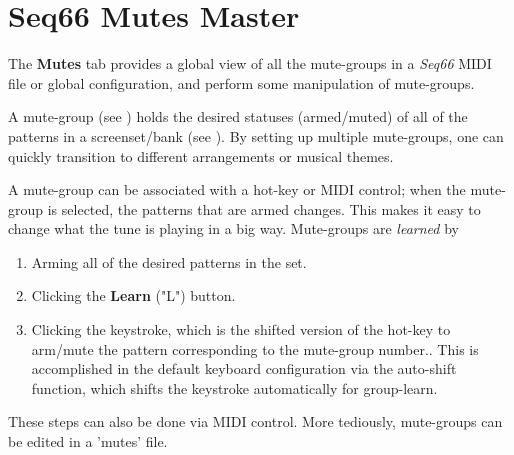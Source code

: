 %
%
%

\section{Seq66 Mutes Master}
\label{sec:mutes_master}

   The \textbf{Mutes} tab provides a global view of all the mute-groups
   in a \textsl{Seq66} MIDI file or global configuration, and perform
   some manipulation of mute-groups.

   A mute-group
   (see )
   holds the desired statuses (armed/muted) of all
   of the patterns in a screenset/bank
   (see ).
   By setting up multiple mute-groups,
   one can quickly transition to different arrangements or
   musical themes.

   A mute-group can be associated with a hot-key or MIDI control;
   when the mute-group is selected, the patterns that are armed changes.
   This makes it easy to change what the tune is playing in a big way.
   Mute-groups are \textsl{learned} by

   \begin{enumerate}
      \item Arming all of the desired patterns in the set.
      \item Clicking the \textbf{Learn} ("L") button.
      \item Clicking the keystroke, which is the shifted version
         of the hot-key to arm/mute the pattern corresponding to
         the mute-group number..
         This is accomplished in the default keyboard configuration via the
         auto-shift function, which shifts the keystroke automatically
         for group-learn.
   \end{enumerate}

   These steps can also be done via MIDI control.
   More tediously, mute-groups can be edited in a 'mutes' file.

